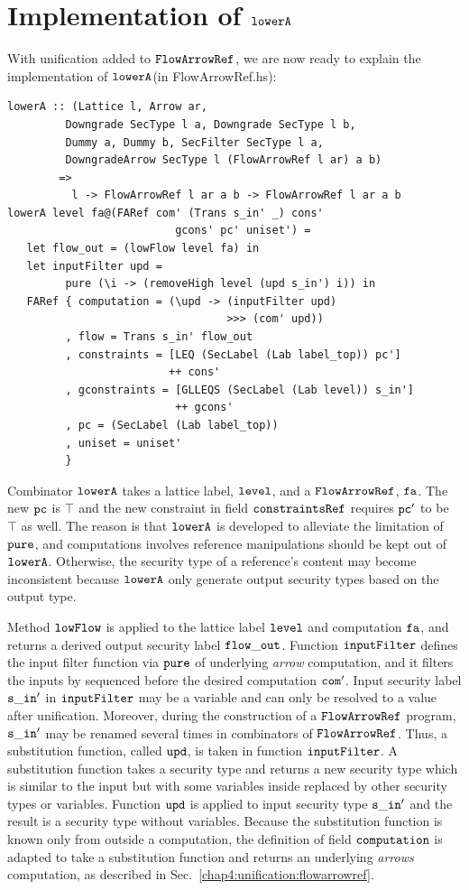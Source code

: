 \documentclass{report}
\newcommand{\co}[1]{$\cod{#1}$}
\begin{document}
\section{Implementation of \co{lowerA}}
\label{chap5:lower:implement}
With unification added to \co{FlowArrowRef}, we are now ready to explain the implementation
of \co{lowerA}(in FlowArrowRef.hs):
\begin{Verbatim}[fontsize=\small]
lowerA :: (Lattice l, Arrow ar,
         Downgrade SecType l a, Downgrade SecType l b,
         Dummy a, Dummy b, SecFilter SecType l a,
         DowngradeArrow SecType l (FlowArrowRef l ar) a b)
        =>
          l -> FlowArrowRef l ar a b -> FlowArrowRef l ar a b
lowerA level fa@(FARef com' (Trans s_in' _) cons' 
                          gcons' pc' uniset') =
   let flow_out = (lowFlow level fa) in
   let inputFilter upd = 
         pure (\i -> (removeHigh level (upd s_in') i)) in
   FARef { computation = (\upd -> (inputFilter upd) 
                                  >>> (com' upd))
         , flow = Trans s_in' flow_out
         , constraints = [LEQ (SecLabel (Lab label_top)) pc'] 
                         ++ cons'
         , gconstraints = [GLLEQS (SecLabel (Lab level)) s_in'] 
                          ++ gcons'
         , pc = (SecLabel (Lab label_top))
         , uniset = uniset'
         }
\end{Verbatim}
Combinator \co{lowerA} takes a lattice label, \co{level}, and a \co{FlowArrowRef}, \co{fa}.
The new \co{pc} is $\top$ and the new constraint in field \co{constraintsRef} requires \co{pc'} to
be $\top$ as well.
The reason is that \co{lowerA} is developed to alleviate the limitation of \co{pure}, and computations involves
reference manipulations should be kept out of \co{lowerA}. Otherwise, the security type of a reference's
content may become inconsistent because \co{lowerA} only generate output security types based on the output
type.

Method \co{lowFlow} is applied to the lattice label \co{level} and computation \co{fa},
and returns a derived output security label \co{flow\_out}.
Function \co{inputFilter} defines the input filter function via \co{pure} of underlying {\em arrow} computation,
and it filters the inputs by sequenced before the desired computation \co{com'}.
Input security label \co{s\_in'} in \co{inputFilter} may be a variable and can only be resolved to a value 
after unification. 
Moreover, during the construction of a \co{FlowArrowRef} program, \co{s\_in'} may be renamed several times 
in combinators of \co{FlowArrowRef}. 
Thus, a substitution function, called \co{upd}, is taken in function \co{inputFilter}. 
A substitution function takes a security type and returns a new security type which is similar to the input but
with some variables inside replaced by other security types or variables. Function \co{upd} is applied to input security
type \co{s\_in'} and the result is a security type without variables.
Because the substitution function is known only from outside a computation, the definition
of field \co{computation} is adapted to take a substitution function and returns an underlying {\em arrows} computation,
as described in Sec.~\ref{chap4:unification:flowarrowref}.
\end{document}
